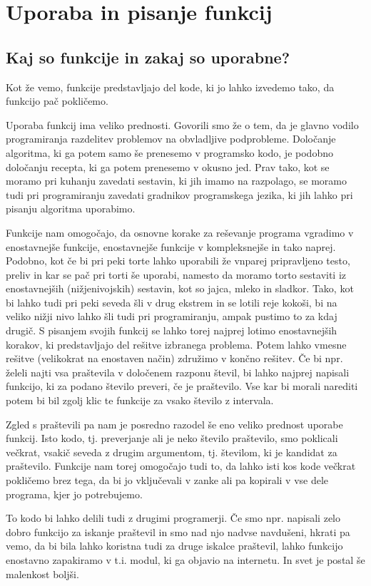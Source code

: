\chapter{Uporaba in pisanje funkcij}
\section{Kaj so funkcije in zakaj so uporabne?}
Kot že vemo, funkcije predstavljajo del kode, ki jo lahko izvedemo tako, da funkcijo pač pokličemo. 

Uporaba funkcij ima veliko prednosti. Govorili smo že o tem, da je glavno vodilo programiranja razdelitev problemov na obvladljive podprobleme. Določanje algoritma, ki ga potem samo še prenesemo v programsko kodo, je podobno določanju recepta, ki ga potem prenesemo v okusno jed. Prav tako, kot se moramo pri kuhanju zavedati sestavin, ki jih imamo na razpolago, se moramo tudi pri programiranju zavedati gradnikov programskega jezika, ki jih lahko pri pisanju algoritma uporabimo. 

Funkcije nam omogočajo, da osnovne korake za reševanje programa vgradimo v enostavnejše funkcije, enostavnejše funkcije v kompleksnejše in tako naprej. Podobno, kot če bi pri peki torte lahko uporabili že vnparej pripravljeno testo, preliv in kar se pač pri torti še uporabi, namesto da moramo torto sestaviti iz enostavnejših (nižjenivojskih) sestavin, kot so jajca, mleko in sladkor. Tako, kot bi lahko tudi pri peki seveda šli v drug ekstrem in se lotili reje kokoši, bi na veliko nižji nivo lahko šli tudi pri programiranju, ampak pustimo to za kdaj drugič. S pisanjem svojih funkcij se lahko torej najprej lotimo enostavnejših korakov, ki predstavljajo del rešitve izbranega problema. Potem lahko vmesne rešitve (velikokrat na enostaven način) združimo v končno rešitev. Če bi npr. želeli najti vsa praštevila v določenem razponu števil, bi lahko najprej napisali funkcijo, ki za podano število preveri, če je praštevilo. Vse kar bi morali narediti potem bi bil zgolj klic te funkcije za vsako število z intervala.

Zgled s praštevili pa nam je posredno razodel še eno veliko prednost uporabe funkcij. Isto kodo, tj. preverjanje ali je neko število praštevilo, smo poklicali večkrat, vsakič seveda z drugim argumentom, tj. številom, ki je kandidat za praštevilo. Funkcije nam torej omogočajo tudi to, da lahko isti kos kode večkrat pokličemo brez tega, da bi jo vključevali v zanke ali pa kopirali v vse dele programa, kjer jo potrebujemo. 

To kodo bi lahko delili tudi z drugimi programerji. Če smo npr. napisali zelo dobro funkcijo za iskanje praštevil in smo nad njo nadvse navdušeni, hkrati pa vemo, da bi bila lahko koristna tudi za druge iskalce praštevil, lahko funkcijo enostavno zapakiramo v t.i. modul, ki ga objavio na internetu. In svet je postal še malenkost boljši.

